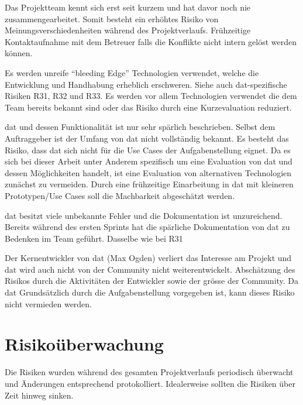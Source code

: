 {Das Projektteam kennt sich erst seit kurzem und hat davor noch nie zusammengearbeitet. Somit besteht ein erhöhtes Risiko von Meinungsverschiedenheiten während des Projektverlaufs.}
{Frühzeitige Kontaktaufnahme mit dem Betreuer falls die Konflikte nicht intern gelöst werden können.}

{Es werden unreife ``bleeding Edge'' Technologien verwendet, welche die Entwicklung und Handhabung erheblich erschweren. Siehe auch \gls{dat}-spezifische Risiken R31, R32 und R33.}
{Es werden vor allem Technologien verwendet die dem Team bereits bekannt sind oder das Risiko durch eine Kurzevaluation reduziert.}

{\gls{dat} und dessen Funktionalität ist nur sehr spärlich beschrieben. Selbst dem Auftraggeber ist der Umfang von \gls{dat} nicht vollständig bekannt. Es besteht das Risiko, dass \gls{dat} sich nicht für die Use Cases der Aufgabenstellung eignet.}
{Da es sich bei dieser Arbeit unter Anderem spezifisch um eine Evaluation von \gls{dat} und dessen Möglichkeiten handelt, ist eine Evaluation von alternativen Technologien zunächst zu vermeiden. Durch eine frühzeitige Einarbeitung in \gls{dat} mit kleineren Prototypen/Use Cases soll die Machbarkeit abgeschätzt werden.}


{\gls{dat} besitzt viele unbekannte Fehler und die Dokumentation ist unzureichend. Bereits während des ersten Sprints hat die spärliche Dokumentation von \gls{dat} zu Bedenken im Team geführt.}
{Dasselbe wie bei R31}


{Der Kernentwickler von \gls{dat} (Max Ogden) verliert das Interesse am Projekt und \gls{dat} wird auch nicht von der Community nicht weiterentwickelt.}
{Abschätzung des Risikos durch die Aktivitäten der Entwickler sowie der grösse der Community. Da \gls{dat} Grundsätzlich durch die Aufgabenstellung vorgegeben ist, kann dieses Risiko nicht vermieden werden.}


\section{Risikoüberwachung}

Die Risiken wurden während des gesamten Projektverlaufs periodisch überwacht und Änderungen entsprechend protokolliert. Idealerweise sollten die Risiken über Zeit hinweg sinken.

